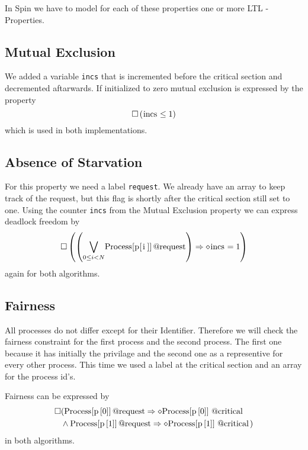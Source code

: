 \documentclass{llncs}
\begin{document}
In Spin we have to model for each of these properties one or more
LTL - Properties.

\subsection{Mutual Exclusion}

We added a variable \lstinline|incs| that is incremented before the critical section
and decremented aftarwards. If initialized to zero mutual exclusion is expressed by the
property
\begin{equation}
    \square \left( \text{\lstinline|incs|} \leq 1 \right)
\end{equation}
which is used in both implementations.

\subsection{Absence of Starvation}

For this property we need a label \lstinline|request|. We already have an array to keep track of the request,
but this flag is shortly after the critical section still set to one.
Using the counter \lstinline|incs| from the Mutual Exclusion property we can express deadlock freedom by
\begin{equation}
    \square \left( \left( \underset{0\leq i < N}{\bigvee} \text{\lstinline|Process[p[i]]@request|}\right) \Rightarrow \diamond \text{\lstinline|incs|} = 1 \right)
\end{equation}
again for both algorithms.
\subsection{Fairness}

All processes do not differ except for their Identifier. Therefore we will check the fairness constraint for the first process and the second process.
The first one because it has initially the privilage and the second one as a representive for every other process.
This time we used a label at the critical section and an array for the process id's.

Fairness can be expressed by
\begin{eqnarray}
    \square & ( \text{\lstinline|Process[p[0]]@request|} \Rightarrow \diamond \text{\lstinline|Process[p[0]]@critical|} \\
    &\land \text{\lstinline|Process[p[1]]@request|}\Rightarrow \diamond \text{\lstinline|Process[p[1]]@critical|})
\end{eqnarray}
in both algorithms.
\end{document}
